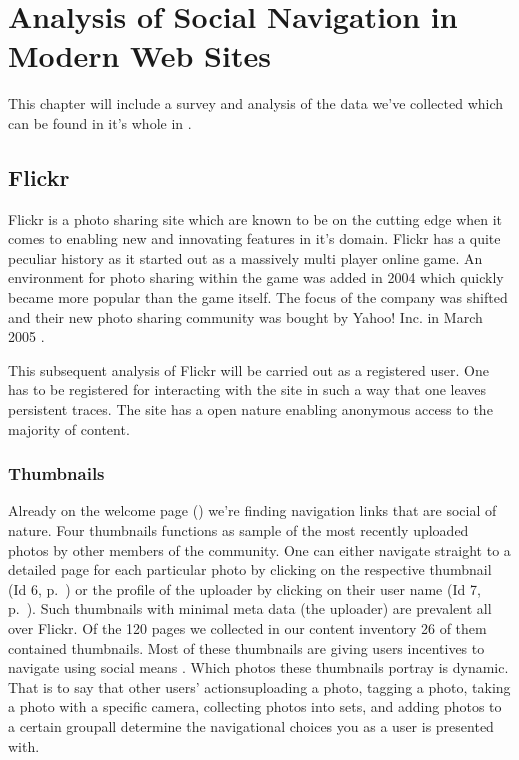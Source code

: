 \chapter{Analysis of Social Navigation in Modern Web Sites}
\label{chapter:analysis}

This chapter will include a survey and analysis of the data we've collected
which can be found in it's whole in
.

\section{Flickr}


Flickr is a photo sharing site which are known to be on the cutting edge when
it comes to enabling new and innovating features in it's domain. Flickr has a
quite peculiar history as it started out as a massively multi player online
game. An environment for photo sharing within the game was added in 2004 which
quickly became more popular than the game itself. The focus of the company was
shifted and their new photo sharing community was bought by Yahoo! Inc. in
March 2005 \citep[]{livingston07}.

This subsequent
analysis of Flickr will be carried out as a registered user. One has to be
registered for interacting with the site in such a way that one leaves
persistent traces. The site has a open nature enabling anonymous access
to the majority of content.

\subsection{Thumbnails}

Already on the welcome page ()
we're finding navigation links that are social of
nature. Four thumbnails functions as sample of the most recently uploaded
photos by other members of the community. One can either navigate straight to
a detailed page for each particular photo by clicking on the respective
thumbnail (Id 6, p.~\pageref{table:flickr.content.inventory.6})
or the profile of the uploader by clicking on their user
name (Id 7, p.~\pageref{table:flickr.content.inventory.7}). Such thumbnails
with minimal meta data (the uploader) are prevalent all over Flickr. Of the
120 pages we collected in our content inventory 26 of them contained
thumbnails. Most of these thumbnails
are giving users incentives to navigate using social means%
.
Which photos these thumbnails portray is dynamic. That is to say that other
users' actions\dash{}uploading a photo, tagging a photo, taking a photo with a
specific camera, collecting photos into sets, and adding photos to a certain
group\dash{}all determine the navigational choices you as a user is
presented with.

